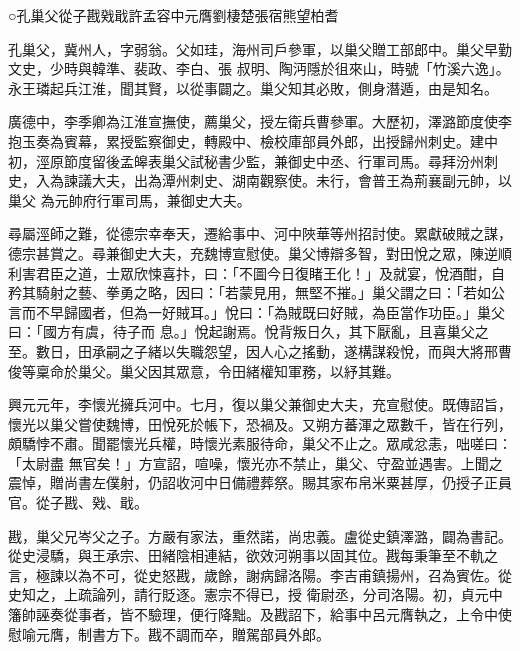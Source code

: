 
\begin{pinyinscope}

 ○孔巢父從子戡戣戢許孟容中元膺劉棲楚張宿熊望柏耆



 孔巢父，冀州人，字弱翁。父如珪，海州司戶參軍，以巢父贈工部郎中。巢父早勤文史，少時與韓準、裴政、李白、張
 叔明、陶沔隱於徂來山，時號「竹溪六逸」。永王璘起兵江淮，聞其賢，以從事闢之。巢父知其必敗，側身潛遁，由是知名。



 廣德中，李季卿為江淮宣撫使，薦巢父，授左衛兵曹參軍。大歷初，澤潞節度使李抱玉奏為賓幕，累授監察御史，轉殿中、檢校庫部員外郎，出授歸州刺史。建中初，涇原節度留後孟皞表巢父試秘書少監，兼御史中丞、行軍司馬。尋拜汾州刺史，入為諫議大夫，出為潭州刺史、湖南觀察使。未行，會普王為荊襄副元帥，以巢父
 為元帥府行軍司馬，兼御史大夫。



 尋屬涇師之難，從德宗幸奉天，遷給事中、河中陜華等州招討使。累獻破賊之謀，德宗甚賞之。尋兼御史大夫，充魏博宣慰使。巢父博辯多智，對田悅之眾，陳逆順利害君臣之道，士眾欣悚喜抃，曰：「不圖今日復睹王化！」及就宴，悅酒酣，自矜其騎射之藝、拳勇之略，因曰：「若蒙見用，無堅不摧。」巢父謂之曰：「若如公言而不早歸國者，但為一好賊耳。」悅曰：「為賊既曰好賊，為臣當作功臣。」巢父曰：「國方有虞，待子而
 息。」悅起謝焉。悅背叛日久，其下厭亂，且喜巢父之至。數日，田承嗣之子緒以失職怨望，因人心之搖動，遂構謀殺悅，而與大將邢曹俊等稟命於巢父。巢父因其眾意，令田緒權知軍務，以紓其難。



 興元元年，李懷光擁兵河中。七月，復以巢父兼御史大夫，充宣慰使。既傳詔旨，懷光以巢父嘗使魏博，田悅死於帳下，恐禍及。又朔方蕃渾之眾數千，皆在行列，頗驕悖不肅。聞罷懷光兵權，時懷光素服待命，巢父不止之。眾咸忿恚，咄嗟曰：「太尉盡
 無官矣！」方宣詔，喧噪，懷光亦不禁止，巢父、守盈並遇害。上聞之震悼，贈尚書左僕射，仍詔收河中日備禮葬祭。賜其家布帛米粟甚厚，仍授子正員官。從子戡、戣、戢。



 戡，巢父兄岑父之子。方嚴有家法，重然諾，尚忠義。盧從史鎮澤潞，闢為書記。從史浸驕，與王承宗、田緒陰相連結，欲效河朔事以固其位。戡每秉筆至不軌之言，極諫以為不可，從史怒戡，歲餘，謝病歸洛陽。李吉甫鎮揚州，召為賓佐。從史知之，上疏論列，請行貶逐。憲宗不得已，授
 衛尉丞，分司洛陽。初，貞元中籓帥誣奏從事者，皆不驗理，便行降黜。及戡詔下，給事中呂元膺執之，上令中使慰喻元膺，制書方下。戡不調而卒，贈駕部員外郎。




\end{pinyinscope}
